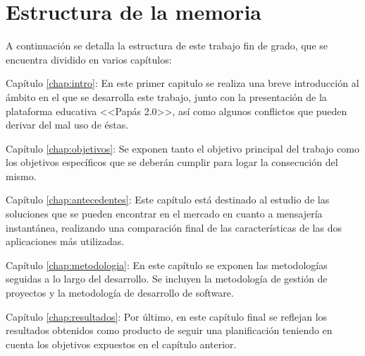 \section{Estructura de la memoria}
A continuación se detalla la estructura de este trabajo fin de grado, que se encuentra dividido en varios capítulos:

\begin{definitionlist}	
	\item[Capítulo \ref{chap:intro}: \nameref{chap:intro}]
	En este primer capitulo se realiza una breve introducción al ámbito en el que se desarrolla este trabajo, junto con la presentación de la plataforma educativa <<Papás 2.0>>, así como algunos conflictos que pueden derivar del mal uso de éstas.
	
	\item[Capítulo \ref{chap:objetivos}: \nameref{chap:objetivos}]
	Se exponen tanto el objetivo principal del trabajo como los objetivos específicos que se deberán cumplir para logar la consecución del mismo.
	
	\item[Capítulo \ref{chap:antecedentes}: \nameref{chap:antecedentes}]
	Este capítulo está destinado al estudio de las soluciones que se pueden encontrar en el mercado en cuanto a mensajería instantánea, realizando una comparación final de las características de las dos aplicaciones más utilizadas.
	
	\item[Capítulo \ref{chap:metodologia}: \nameref{chap:metodologia}]
	En este capítulo se exponen las metodologías seguidas a lo largo del desarrollo. Se incluyen la metodología de gestión de proyectos y la metodología de desarrollo de software.
	
	\item[Capítulo \ref{chap:resultados}: \nameref{chap:resultados}]
	Por último, en este capítulo final se reflejan los resultados obtenidos como producto de seguir una planificación teniendo en cuenta los objetivos expuestos en el capítulo anterior.
\end{definitionlist}

